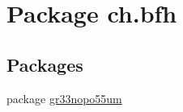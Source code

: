 \hypertarget{namespacech_1_1bfh}{}\section{Package ch.\+bfh}
\label{namespacech_1_1bfh}
\subsection*{Packages}
\begin{DoxyCompactItemize}
\item 
package \hyperlink{namespacech_1_1bfh_1_1gr33nopo55um}{gr33nopo55um}
\end{DoxyCompactItemize}
